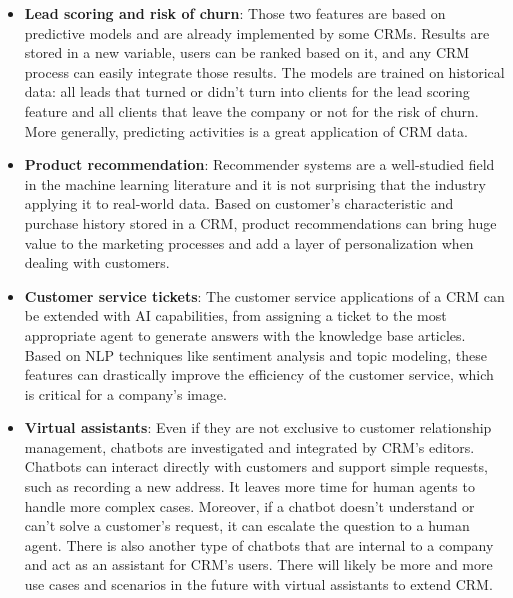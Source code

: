 \begin{itemize}
    \item \textbf{Lead scoring and risk of churn}: Those two features are based on predictive models and are already implemented by some CRMs. Results are stored in a new variable, users can be ranked based on it, and any CRM process can easily integrate those results. The models are trained on historical data: all leads that turned or didn't turn into clients for the lead scoring feature and all clients that leave the company or not for the risk of churn. More generally, predicting activities is a great application of CRM data.
    
    \item \textbf{Product recommendation}: Recommender systems are a well-studied field in the machine learning literature and it is not surprising that the industry applying it to real-world data. Based on customer's characteristic and purchase history stored in a CRM, product recommendations can bring huge value to the marketing processes and add a layer of personalization when dealing with customers.
    \item \textbf{Customer service tickets}: The customer service applications of a CRM can be extended with AI capabilities, from assigning a ticket to the most appropriate agent to generate answers with the knowledge base articles. Based on NLP techniques like sentiment analysis and topic modeling, these features can drastically improve the efficiency of the customer service, which is critical for a company's image.
    \item \textbf{Virtual assistants}: Even if they are not exclusive to customer relationship management, chatbots are investigated and integrated by CRM's editors. Chatbots can interact directly with customers and support simple requests, such as recording a new address. It leaves more time for human agents to handle more complex cases. Moreover, if a chatbot doesn't understand or can't solve a customer's request, it can escalate the question to a human agent. There is also another type of chatbots that are internal to a company and act as an assistant for CRM's users. There will likely be more and more use cases and scenarios in the future with virtual assistants to extend CRM.
\end{itemize}

